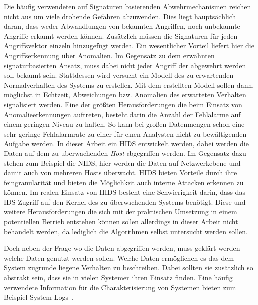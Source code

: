 Die häufig verwendeten auf Signaturen basierenden Abwehrmechanismen reichen nicht aus um viele drohende Gefahren abzuwenden.
Dies liegt hauptsächlich daran, dass weder Abwandlungen von bekannten Angriffen, noch unbekannte Angriffe erkannt werden können.
Zusätzlich müssen die Signaturen für jeden Angriffsvektor einzeln hinzugefügt werden.
Ein wesentlicher Vorteil liefert hier die Angriffserkennung über Anomalien.
Im Gegensatz zu dem erwähnten signaturbasierten Ansatz, muss dabei nicht jeder Angriff der abgewehrt werden soll bekannt sein.
Stattdessen wird versucht ein Modell des zu erwartenden Normalverhalten des Systems zu erstellen.
Mit dem erstellten Modell sollen dann, möglichst in Echtzeit, Abweichungen bzw. Anomalien des erwarteten Verhalten signalisiert werden.
Eine der größten Herausforderungen die beim Einsatz von Anomalieerkennungen auftreten, besteht darin die Anzahl der Fehlalarme auf einem geringen Niveau zu halten. 
So kann bei großen Datenmengen schon eine sehr geringe Fehlalarmrate  zu einer für einen Analysten nicht zu bewältigenden Aufgabe werden. \cite{ANOMALY_SURVEY}
In dieser Arbeit ein \ac{HIDS} entwickelt werden, dabei werden die Daten auf dem zu überwachenden \textit{Host} abgegriffen werden.
Im Gegensatz dazu stehen zum Beispiel die \ac{NIDS}, hier werden die Daten auf Netzwerkebene und damit auch von mehreren Hosts überwacht.
\ac{HIDS} bieten Vorteile durch ihre feingranularität und bieten die Möglichkeit auch interne Attacken erkennen zu können.
Im realen Einsatz von \ac{HIDS}  besteht eine Schwierigkeit darin, dass das \ac{IDS} Zugriff auf den Kernel des zu überwachenden Systems benötigt.
Diese und weitere Herausforderungen die sich mit der praktischen Umsetzung in einem potentiellen Betrieb entstehen können sollen allerdings in dieser Arbeit nicht behandelt werden, da lediglich die Algorithmen selbst untersucht werden sollen.

Doch neben der Frage wo die Daten abgegriffen werden, muss geklärt werden welche Daten genutzt werden sollen.
Welche Daten ermöglichen es das dem System zugrunde liegene Verhalten zu beschreiben.
Dabei sollten sie zusätzlich so abstrakt sein, dass sie in vielen Systemen ihren Einsatz finden.
Eine häufig verwendete Information für die Charakterisierung von Systemen bieten zum Beispiel System-Logs~\cite{HE}.

